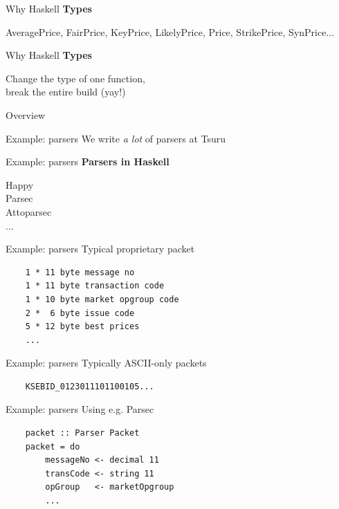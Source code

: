 \documentclass[20pt]{beamer}
\newcommand{\vspaced}{
    \vspace{5mm}
}
\begin{document}
\begin{frame}[fragile]{Why Haskell}
    \textbf{Types} \\
    \vspaced
    AveragePrice, FairPrice, KeyPrice, LikelyPrice, Price, StrikePrice,
    SynPrice...
\end{frame}

\begin{frame}[fragile]{Why Haskell}
    \textbf{Types} \\
    \vspaced
    Change the type of one function, \\
    break the entire build (yay!) \\
\end{frame}


\begin{frame}{Overview}
\end{frame}

\begin{frame}{Example: parsers}
    We write \emph{a lot} of parsers at Tsuru
\end{frame}

\begin{frame}{Example: parsers}
    \textbf{Parsers in Haskell} \\
    \vspaced
    Happy \\
    Parsec \\
    Attoparsec \\
    ... \\
\end{frame}

\begin{frame}[fragile]{Example: parsers}
    Typical proprietary packet \\
    \vspaced
    \begin{lstlisting}
    1 * 11 byte message no
    1 * 11 byte transaction code
    1 * 10 byte market opgroup code
    2 *  6 byte issue code
    5 * 12 byte best prices
    ...
    \end{lstlisting}
\end{frame}

\begin{frame}[fragile]{Example: parsers}
    Typically ASCII-only packets
    \vspaced
    \begin{lstlisting}
    KSEBID_0123011101100105...
    \end{lstlisting}
\end{frame}

\begin{frame}[fragile]{Example: parsers}
    Using e.g. Parsec \\
    \vspaced
    \begin{lstlisting}
    packet :: Parser Packet
    packet = do
        messageNo <- decimal 11
        transCode <- string 11
        opGroup   <- marketOpgroup
        ...
    \end{lstlisting}
\end{frame}
\end{document}
